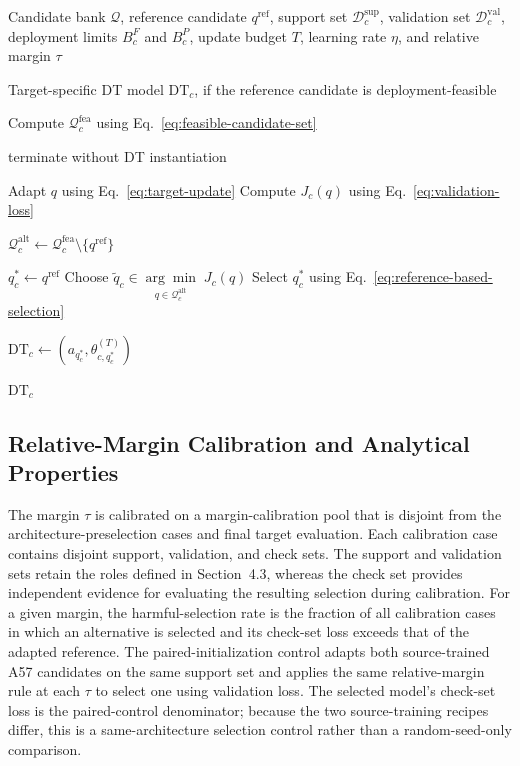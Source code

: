 \documentclass[a4paper,fleqn]{cas-sc}
\begin{document}
\begin{algorithm}[H]
\caption{Target-Side MSA-DTI for One Center}
\label{alg:msa-dti}
\begin{algorithmic}[1]

\Require Candidate bank $\mathcal{Q}$, reference candidate
$q^{\mathrm{ref}}$, support set $\mathcal{D}_{c}^{\mathrm{sup}}$,
validation set $\mathcal{D}_{c}^{\mathrm{val}}$, deployment limits
$B_c^{F}$ and $B_c^{P}$, update budget $T$,
learning rate $\eta$, and relative margin $\tau$

\Ensure Target-specific DT model $\mathrm{DT}_c$, if the reference candidate is deployment-feasible

\State Compute $\mathcal{Q}_{c}^{\mathrm{fea}}$ using
Eq.~\eqref{eq:feasible-candidate-set}

    \State terminate without DT instantiation
\EndIf

    \State Adapt $q$ using Eq.~\eqref{eq:target-update}
    \State Compute $J_c(q)$ using Eq.~\eqref{eq:validation-loss}
\EndFor

\State
$\mathcal{Q}_{c}^{\mathrm{alt}}
\gets
\mathcal{Q}_{c}^{\mathrm{fea}}
\setminus
\{q^{\mathrm{ref}}\}$

    \State $q_c^{*}\gets q^{\mathrm{ref}}$
\Else
    \State Choose
    $\widetilde q_c
    \in
    \underset{q\in\mathcal{Q}_{c}^{\mathrm{alt}}}
    {\arg\min}\;J_c(q)$
    \State Select $q_c^{*}$ using
    Eq.~\eqref{eq:reference-based-selection}
\EndIf

\State
$\mathrm{DT}_{c}
\gets
\left(
a_{q_c^{*}},
\theta_{c,q_c^{*}}^{(T)}
\right)$

\State \Return $\mathrm{DT}_{c}$

\end{algorithmic}
\end{algorithm}

\subsection{Relative-Margin Calibration and Analytical Properties}

The margin $\tau$ is calibrated on a margin-calibration pool that is disjoint
from the architecture-preselection cases and final target evaluation. Each
calibration case contains disjoint support, validation, and check sets. The
support and validation sets retain the roles defined in Section~4.3, whereas the check set
provides independent evidence for evaluating the resulting selection during
calibration. For a given margin, the harmful-selection rate is the fraction of
all calibration cases in which an alternative is selected and its check-set
loss exceeds that of the adapted reference. The paired-initialization control adapts both source-trained A57 candidates on
the same support set and applies the same relative-margin rule at each $\tau$ to
select one using validation loss. The selected model's check-set loss is the
paired-control denominator; because the two source-training recipes differ, this
is a same-architecture selection control rather than a random-seed-only
comparison.
\end{document}
